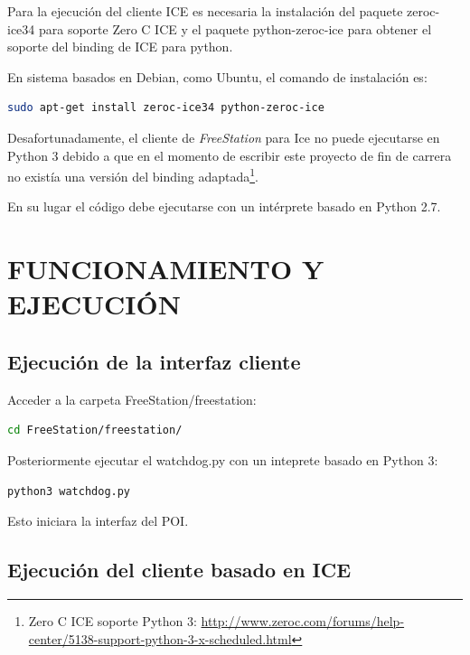    Para la ejecución del cliente ICE es necesaria la instalación del paquete
    zeroc-ice34 para soporte Zero C ICE y el paquete python-zeroc-ice para
    obtener el soporte del binding de ICE para python.

    En sistema basados en Debian, como Ubuntu, el comando de instalación es:

    \begin{lstlisting}[language={bash}, texcl=false, caption={Instalar
    dependencias ICE}] sudo apt-get install zeroc-ice34 python-zeroc-ice
    \end{lstlisting}

    Desafortunadamente, el cliente de \emph{FreeStation} para Ice no puede ejecutarse
    en Python 3 debido a que en el momento de escribir este proyecto de fin de
    carrera no existía una versión del binding
    adaptada\footnote{Zero C ICE soporte Python 3:
    \url{http://www.zeroc.com/forums/help-center/5138-support-python-3-x-scheduled.html}}.

    En su lugar el código debe ejecutarse con un intérprete basado en Python
    2.7.
    
    \section{\uppercase{Funcionamiento y ejecución}}

    \subsection{Ejecución de la interfaz cliente}
    \label{sec:clientexecution}
    
    Acceder a la carpeta FreeStation/freestation:
    
    \begin{lstlisting}[language={bash}, texcl=false, caption={Cambiar
    directorio}] cd FreeStation/freestation/
    \end{lstlisting}
    
    Posteriormente ejecutar el watchdog.py con un inteprete basado en Python 3:

    \begin{lstlisting}[language={bash}, texcl=false, caption={Ejecutar cliente}]
    python3 watchdog.py
    \end{lstlisting}

    Esto iniciara la interfaz del POI.
   
    \subsection{Ejecución del cliente basado en ICE}
    
